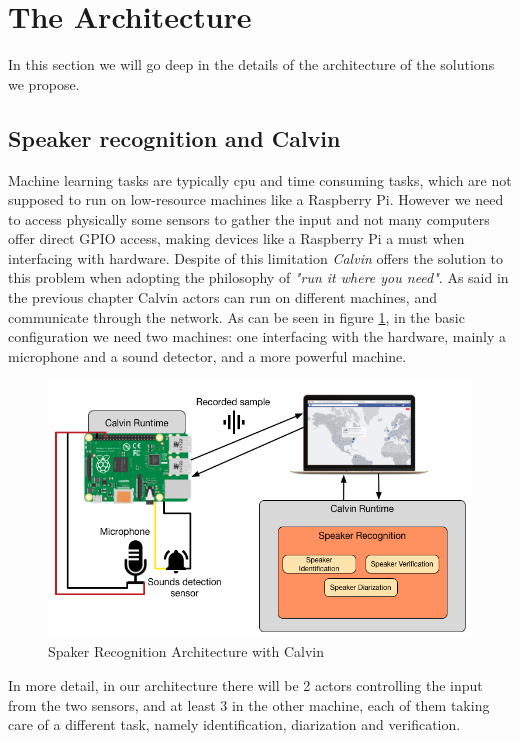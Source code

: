 \section{The Architecture}

In this section we will go deep in the details of the architecture of the solutions
we propose.

\subsection{Speaker recognition and Calvin}

Machine learning tasks are typically cpu and time consuming tasks, which
are not supposed to run on low-resource machines like a Raspberry Pi. However
we need to access physically some sensors to gather the input and not many computers
offer direct GPIO access, making devices like a Raspberry Pi a must when interfacing
with hardware. Despite of this limitation \textit{Calvin} offers the solution to this problem
when adopting the philosophy of \textit{"run it where you need"}. As said in the previous chapter
Calvin actors can run on different machines, and communicate through the network.
As can be seen in figure \ref{fig:calvin-spkr1}, in the basic configuration we need two machines:
one interfacing with the hardware, mainly a microphone and a sound detector, and a more powerful
machine.

\begin{figure}[h]
\caption{Spaker Recognition Architecture with Calvin}
\label{fig:calvin-spkr1}
\centering
\includegraphics[scale=0.50]{calvin-speaker1.png}
\end{figure}

In more detail, in our architecture there will be 2 actors controlling the input from
the two sensors, and at least 3 in the other machine, each of them taking care of a different
task, namely identification, diarization and verification.

